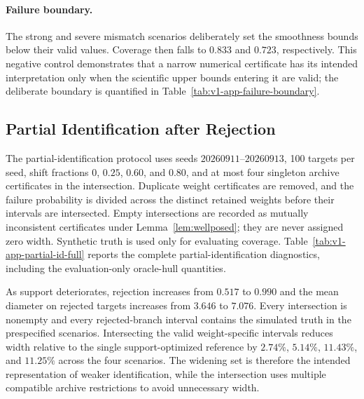 \documentclass[11pt]{article}
\numberwithin{equation}{section}
\newcommand{\1}{\mathbf 1}
\begin{document}
\paragraph{Failure boundary.}
The strong and severe mismatch scenarios deliberately set the smoothness bounds below their valid values.  Coverage then falls to $0.833$ and $0.723$, respectively.  This negative control demonstrates that a narrow numerical certificate has its intended interpretation only when the scientific upper bounds entering it are valid; the deliberate boundary is quantified in Table~\ref{tab:v1-app-failure-boundary}.




\subsection{Partial Identification after Rejection}
\label{app:partial-identification}
\suppressfloats[t]

The partial-identification protocol uses seeds $20260911$--$20260913$, 100 targets per seed, shift fractions $0$, $0.25$, $0.60$, and $0.80$, and at most four singleton archive certificates in the intersection.  Duplicate weight certificates are removed, and the failure probability is divided across the distinct retained weights before their intervals are intersected.  Empty intersections are recorded as mutually inconsistent certificates under Lemma~\ref{lem:wellposed}; they are never assigned zero width.  Synthetic truth is used only for evaluating coverage. Table~\ref{tab:v1-app-partial-id-full} reports the complete partial-identification diagnostics, including the evaluation-only oracle-hull quantities.



As support deteriorates, rejection increases from $0.517$ to $0.990$ and the mean diameter on rejected targets increases from $3.646$ to $7.076$.  Every intersection is nonempty and every rejected-branch interval contains the simulated truth in the prespecified scenarios.  Intersecting the valid weight-specific intervals reduces width relative to the single support-optimized reference by $2.74\%$, $5.14\%$, $11.43\%$, and $11.25\%$ across the four scenarios.  The widening set is therefore the intended representation of weaker identification, while the intersection uses multiple compatible archive restrictions to avoid unnecessary width.
\end{document}

